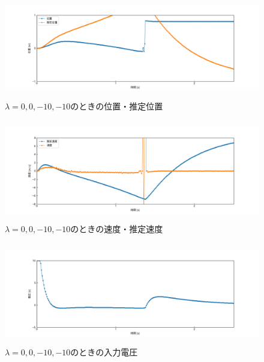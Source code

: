 \documentclass[12pt]{jsarticle}
\begin{document}
\begin{figure}[H]
  \begin{center}
    \includegraphics[clip,width=13.0cm, height=4.4cm]{../img/Exp7-1.png}
    \caption{$\lambda=0, 0, -10, -10$のときの位置・推定位置}
    \label{Exp7-1}
  \end{center}
\end{figure}
\begin{figure}[H]
  \begin{center}
    \includegraphics[clip,width=13.0cm, height=4.4cm]{../img/Exp7-2.png}
    \caption{$\lambda=0, 0, -10, -10$のときの速度・推定速度}
    \label{Exp7-2}
  \end{center}
\end{figure}
\begin{figure}[H]
  \begin{center}
    \includegraphics[clip,width=13.0cm, height=4.4cm]{../img/Exp7-3.png}
    \caption{$\lambda=0, 0, -10, -10$のときの入力電圧}
    \label{Exp7-3}
  \end{center}
\end{figure}
\end{document}
